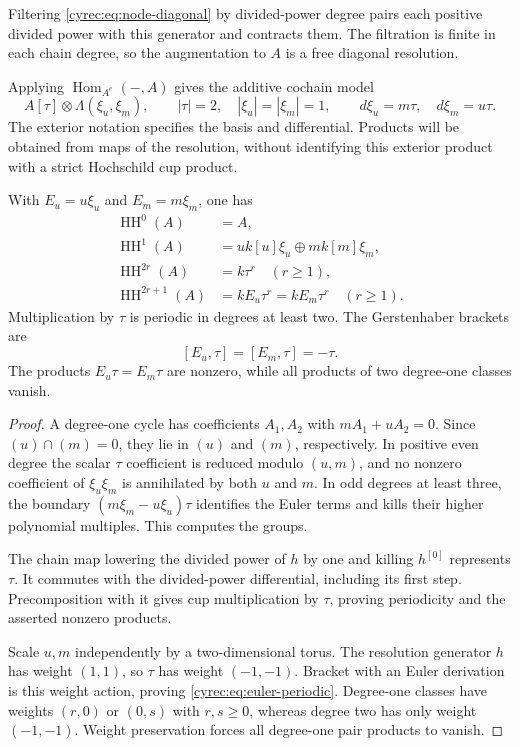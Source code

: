 Filtering \eqref{cyrec:eq:node-diagonal} by divided-power degree
pairs each positive divided power with this generator and
contracts them. The filtration is finite in each chain degree,
so the augmentation to $A$ is a free diagonal resolution.

Applying $\operatorname{Hom}_{A^e}(-,A)$ gives the additive
cochain model
\begin{equation}\label{cyrec:eq:node-hochschild-complex}
 A[\tau]\otimes\Lambda(\xi_u,\xi_m),
 \qquad |\tau|=2,\quad |\xi_u|=|\xi_m|=1,
 \qquad d\xi_u=m\tau,\quad d\xi_m=u\tau.
\end{equation}
The exterior notation specifies the basis and differential.
Products will be obtained from maps of the resolution, without
identifying this exterior product with a strict Hochschild cup
product.

\begin{proposition}\label{cyrec:prop:node-hochschild}
With $E_u=u\xi_u$ and $E_m=m\xi_m$, one has
\begin{align*}
 \operatorname{HH}^0(A)&=A,\\
 \operatorname{HH}^1(A)&=u k[u]\xi_u\oplus m k[m]\xi_m,\\
 \operatorname{HH}^{2r}(A)&=k\tau^r\quad(r\geq1),\\
 \operatorname{HH}^{2r+1}(A)&=kE_u\tau^r=kE_m\tau^r
                                      \quad(r\geq1).
\end{align*}
Multiplication by $\tau$ is periodic in degrees at least two.
The Gerstenhaber brackets are
\begin{equation}\label{cyrec:eq:euler-periodic}
 [E_u,\tau]=[E_m,\tau]=-\tau.
\end{equation}
The products $E_u\tau=E_m\tau$ are nonzero, while all products
of two degree-one classes vanish.
\end{proposition}

\begin{proof}
A degree-one cycle has coefficients $A_1,A_2$ with
$mA_1+uA_2=0$. Since $(u)\cap(m)=0$, they lie in $(u)$
and $(m)$, respectively. In positive even degree the scalar
$\tau$ coefficient is reduced modulo $(u,m)$, and no nonzero
coefficient of $\xi_u\xi_m$ is annihilated by both $u$ and $m$.
In odd degrees at least three, the boundary
$(m\xi_m-u\xi_u)\tau$ identifies the Euler terms and kills
their higher polynomial multiples. This computes the groups.

The chain map lowering the divided power of $h$ by one and
killing $h^{[0]}$ represents $\tau$.
It commutes with the divided-power differential, including its
first step. Precomposition with it gives cup multiplication by
$\tau$, proving periodicity and the asserted nonzero products.

Scale $u,m$ independently by a two-dimensional torus.
The resolution generator $h$ has weight $(1,1)$, so $\tau$
has weight $(-1,-1)$. Bracket with an Euler derivation is this
weight action, proving \eqref{cyrec:eq:euler-periodic}.
Degree-one classes have weights $(r,0)$ or $(0,s)$ with
$r,s\geq0$, whereas degree two has only weight $(-1,-1)$.
Weight preservation forces all degree-one pair products to vanish.
\end{proof}

